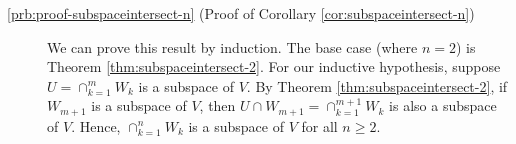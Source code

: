 \begin{description}
\item[\ref{prb:proof-subspaceintersect-n} (Proof of Corollary \ref{cor:subspaceintersect-n})] We can prove this result by induction. The base case (where $ n=2 $) is Theorem \ref{thm:subspaceintersect-2}. For our inductive hypothesis, suppose $ U=\cap_{k=1}^m W_k $ is a subspace of $ V $. By Theorem \ref{thm:subspaceintersect-2}, if $ W_{m+1} $ is a subspace of $ V $, then $ U\cap W_{m+1}=\cap_{k=1}^{m+1}W_k $ is also a subspace of $ V $. Hence, $ \cap_{k=1}^n W_k $ is a subspace of $ V $ for all $ n\geq 2 $.
\end{description}